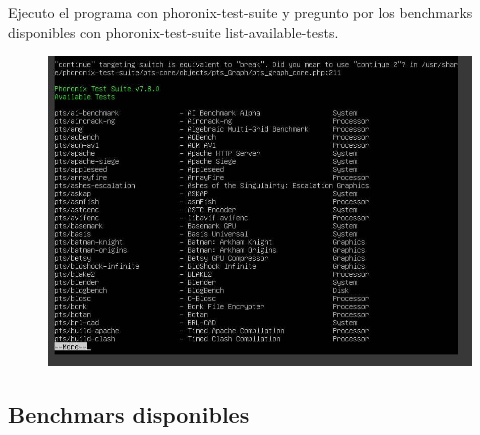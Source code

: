Ejecuto el programa con phoronix-test-suite y pregunto por los benchmarks disponibles con phoronix-test-suite list-available-tests.  
\begin{figure}[H]
\centering
\includegraphics{availabletests.jpg}
\end{figure} 

\subsection{Benchmars disponibles}


